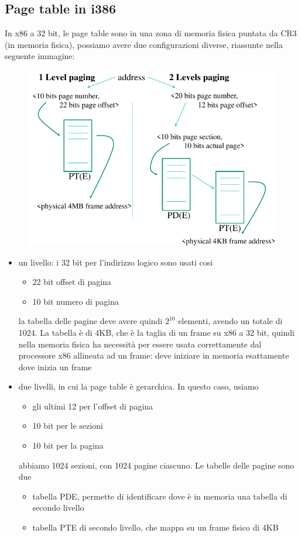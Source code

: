 \documentclass[12pt, oneside]{extbook}
\begin{document}
\subsection{Page table in i386}
In x86 a 32 bit, le page table sono in una zona di memoria fisica puntata da CR3 (in memoria fisica), possiamo avere due configurazioni diverse, riassunte nella seguente immagine:
\begin{figure}[!h]
	\includegraphics[scale=0.4]{immagini/x86_32_pagetable.png}
\end{figure}
\begin{itemize}
\item un livello: i 32 bit per l'indirizzo logico sono usati cosi
\begin{itemize}
\item 22 bit offset di pagina
\item 10 bit numero di pagina
\end{itemize}
la tabella delle pagine deve avere quindi $2^{10}$ elementi, avendo un totale di 1024. La tabella è di 4KB, che è la taglia di un frame su x86 a 32 bit, quindi nella memoria fisica ha necessità per essere usata correttamente dal processore x86 allineata ad un frame: deve iniziare in memoria esattamente dove inizia un frame
\item due livelli, in cui la page table è gerarchica. In questo caso, usiamo
\begin{itemize}
\item gli ultimi 12 per l'offset di pagina
\item 10 bit per le sezioni
\item 10 bit per la pagina
\end{itemize}
abbiamo 1024 sezioni, con 1024 pagine ciascuno. Le tabelle delle pagine sono due
\begin{itemize}
\item tabella PDE, permette di identificare dove è in memoria una tabella di secondo livello
\item tabella PTE di secondo livello, che mappa su un frame fisico di 4KB
\end{itemize}
\end{itemize}
\end{document}
